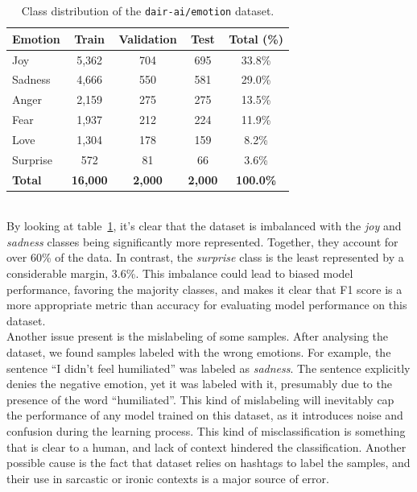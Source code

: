 \documentclass[runningheads]{llncs}
\begin{document}
\begin{table}[H]
\centering
\caption{Class distribution of the \texttt{dair-ai/emotion} dataset.}
\label{tab:dataset_dist}
\begin{tabular}{lcccc}
\hline
\textbf{Emotion} & \textbf{Train} & \textbf{Validation} & \textbf{Test} & \textbf{Total (\%)} \\
\hline
Joy      & 5,362 & 704 & 695 & 33.8\% \\
Sadness  & 4,666 & 550 & 581 & 29.0\% \\
Anger    & 2,159 & 275 & 275 & 13.5\% \\
Fear     & 1,937 & 212 & 224 & 11.9\% \\
Love     & 1,304 & 178 & 159 & 8.2\% \\
Surprise & 572   & 81  & 66  & 3.6\% \\
\hline
\textbf{Total} & \textbf{16,000} & \textbf{2,000} & \textbf{2,000} & \textbf{100.0\%} \\
\hline
\end{tabular}
\end{table}

\vspace{-2em}
\noindent
\\
By looking at table~\ref{tab:dataset_dist}, it's clear that the dataset is imbalanced with the \textit{joy} and \textit{sadness} classes being significantly more represented. Together, they account for over 60\% of the data. In contrast, the \textit{surprise} class is the least represented by a considerable margin, 3.6\%. This imbalance could lead to biased model performance, favoring the majority classes, and makes it clear that F1 score is a more appropriate metric than accuracy for evaluating model performance on this dataset. 
\noindent
\\
Another issue present is the mislabeling of some samples. After analysing the dataset, we found samples labeled with the wrong emotions. For example, the sentence ``I didn't feel humiliated'' was labeled as \textit{sadness}. The sentence explicitly denies the negative emotion, yet it was labeled with it, presumably due to the presence of the word ``humiliated''. This kind of mislabeling will inevitably cap the performance of any model trained on this dataset, as it introduces noise and confusion during the learning process. This kind of misclassification is something that is clear to a human, and lack of context hindered the classification. Another possible cause is the fact that dataset relies on hashtags to label the samples, and their use in sarcastic or ironic contexts is a major source of error.
\noindent
\end{document}
